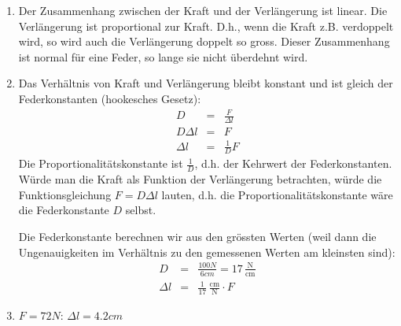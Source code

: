 \documentclass[%
11pt,%
twoside,%
titlepage,%
german,%
headsepline%
]{scrartcl}
\newcommand{\ufrac}[2]{\ensuremath{\,\frac{\mathrm{#1}}{\mathrm{#2}}}}
\begin{document}
{{\begin{enumerate}
\begin{enumerate}
\item Der Zusammenhang zwischen der Kraft und der Verl\"angerung ist linear. Die Verl\"angerung ist proportional zur Kraft. D.h., wenn die Kraft z.B. verdoppelt wird, so wird auch die Verl\"angerung doppelt so gross. Dieser Zusammenhang ist normal f\"ur eine Feder, so lange sie nicht \"uberdehnt wird.
\item Das Verh\"altnis von Kraft und Verl\"angerung bleibt konstant und ist gleich der Federkonstanten (hookesches Gesetz):
  \begin{eqnarray*}
    D & = & \frac{F}{\Delta l} \\
    D\Delta l & = & F \\
    \Delta l & = & \frac{1}{D}F
  \end{eqnarray*}
Die Proportionalit\"atskonstante ist $\frac{1}{D}$, d.h. der Kehrwert der Federkonstanten. W\"urde man die Kraft als Funktion der Verl\"angerung betrachten, w\"urde die Funktionsgleichung $F=D\Delta l$ lauten, d.h. die Proportionalit\"atskonstante w\"are die Federkonstante $D$ selbst.
  
Die Federkonstante berechnen wir aus den gr\"ossten Werten (weil dann die Ungenauigkeiten im Verh\"altnis zu den gemessenen Werten am kleinsten sind):
\begin{eqnarray*}
  D & = & \frac{100\unit{N}}{6\unit{cm}}=17\ufrac{N}{cm} \\
  \Delta l & = & \frac{1}{17}\ufrac{cm}{N}\cdot F
\end{eqnarray*}
\item $F=72\unit{N}$: $\Delta l=4.2\unit{cm}$
\end{enumerate}




\end{enumerate}}}
\end{document}

